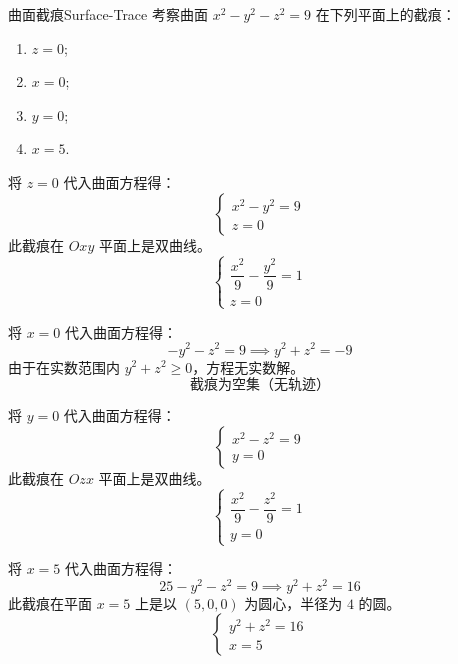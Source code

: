 \begin{problem}{曲面截痕}{Surface-Trace}
    考察曲面 $x^2 - y^2 - z^2 = 9$ 在下列平面上的截痕：
    \begin{enumerate}
        \item $z = 0$;
        \item $x = 0$;
        \item $y = 0$;
        \item $x = 5$.
    \end{enumerate}
\end{problem}

\begin{solution}
    将 $z = 0$ 代入曲面方程得：
    \begin{equation}
        \begin{cases}
            x^2 - y^2 = 9 \\
            z = 0
        \end{cases}
    \end{equation}
    此截痕在 $Oxy$ 平面上是双曲线。
    \begin{equation}
        \boxed{\begin{cases} \dfrac{x^2}{9} - \dfrac{y^2}{9} = 1 \\ z = 0 \end{cases}}
    \end{equation}

    将 $x = 0$ 代入曲面方程得：
    \begin{equation}
        -y^2 - z^2 = 9 \implies y^2 + z^2 = -9
    \end{equation}
    由于在实数范围内 $y^2 + z^2 \ge 0$，方程无实数解。
    \begin{equation}
        \boxed{\text{截痕为空集（无轨迹）}}
    \end{equation}

    将 $y = 0$ 代入曲面方程得：
    \begin{equation}
        \begin{cases}
            x^2 - z^2 = 9 \\
            y = 0
        \end{cases}
    \end{equation}
    此截痕在 $Ozx$ 平面上是双曲线。
    \begin{equation}
        \boxed{\begin{cases} \dfrac{x^2}{9} - \dfrac{z^2}{9} = 1 \\ y = 0 \end{cases}}
    \end{equation}

    将 $x = 5$ 代入曲面方程得：
    \begin{equation}
        25 - y^2 - z^2 = 9 \implies y^2 + z^2 = 16
    \end{equation}
    此截痕在平面 $x = 5$ 上是以 $(5, 0, 0)$ 为圆心，半径为 $4$ 的圆。
    \begin{equation}
        \boxed{\begin{cases} y^2 + z^2 = 16 \\ x = 5 \end{cases}}
    \end{equation}
\end{solution}

